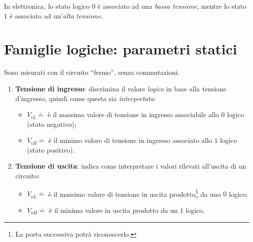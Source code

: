 \documentclass[
]{book}
\providecommand{\tightlist}{%
  \setlength{\itemsep}{0pt}\setlength{\parskip}{0pt}}
\begin{document}
In elettronica, lo stato logico \(0\) è associato ad una \emph{bassa
tensione}, mentre lo stato \(1\) è associato ad un'\emph{alta tensione}.

\section{Famiglie logiche: parametri
statici}\label{famiglie-logiche-parametri-statici}

Sono misurati con il circuito ``fermo'', senza commutazioni.

\begin{enumerate}
\def\labelenumi{\arabic{enumi})}
\tightlist
\item
  \textbf{Tensione di ingresso}: discrimina il valore \emph{logico} in
  base alla tensione d'ingresso, quindi come questa sia
  \emph{interpretata}:

  \begin{itemize}
  \tightlist
  \item
    \(V_{iL} \doteq\) è il massimo valore di tensione in ingresso
    associabile allo \(0\) logico (stato negativo);
  \item
    \(V_{iH} \doteq\) è il minimo valore di tensione in ingresso
    associato allo \(1\) logico (stato positivo).
  \end{itemize}
\item
  \textbf{Tensione di uscita}: indica come interpretare i valori
  rilevati all'uscita di un circuito:

  \begin{itemize}
  \tightlist
  \item
    \(V_{oL} \doteq\) è il massimo valore di tensione in uscita
    prodotto\footnote{La porta successiva potrà riconoscerlo.} da uno
    \(0\) logico;
  \item
    \(V_{oH} \doteq\) è il minimo valore in uscita prodotto da un \(1\)
    logico.
  \end{itemize}
\end{enumerate}
\end{document}
